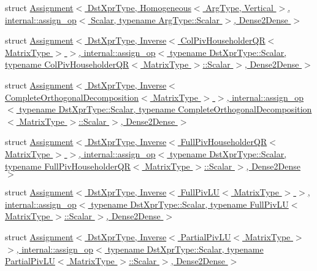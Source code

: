 \begin{DoxyCompactItemize}
\item 
struct \hyperlink{struct_eigen_1_1internal_1_1_assignment_3_01_dst_xpr_type_00_01_homogeneous_3_01_arg_type_00_01_0510af0d603205dcee3ee308c9bc1bc6}{Assignment$<$ Dst\+Xpr\+Type, Homogeneous$<$ Arg\+Type, Vertical $>$, internal\+::assign\+\_\+op$<$ Scalar, typename Arg\+Type\+::\+Scalar $>$, Dense2\+Dense $>$}
\item 
struct \hyperlink{struct_eigen_1_1internal_1_1_assignment_3_01_dst_xpr_type_00_01_inverse_3_01_col_piv_householdera738c212c6cb5ba27ad8c50c6864d6b5}{Assignment$<$ Dst\+Xpr\+Type, Inverse$<$ Col\+Piv\+Householder\+Q\+R$<$ Matrix\+Type $>$ $>$, internal\+::assign\+\_\+op$<$ typename Dst\+Xpr\+Type\+::\+Scalar, typename Col\+Piv\+Householder\+Q\+R$<$ Matrix\+Type $>$\+::\+Scalar $>$, Dense2\+Dense $>$}
\item 
struct \hyperlink{struct_eigen_1_1internal_1_1_assignment_3_01_dst_xpr_type_00_01_inverse_3_01_complete_orthogonalcd5d352c5ea4dcae855a0a56ba39cbfd}{Assignment$<$ Dst\+Xpr\+Type, Inverse$<$ Complete\+Orthogonal\+Decomposition$<$ Matrix\+Type $>$ $>$, internal\+::assign\+\_\+op$<$ typename Dst\+Xpr\+Type\+::\+Scalar, typename Complete\+Orthogonal\+Decomposition$<$ Matrix\+Type $>$\+::\+Scalar $>$, Dense2\+Dense $>$}
\item 
struct \hyperlink{struct_eigen_1_1internal_1_1_assignment_3_01_dst_xpr_type_00_01_inverse_3_01_full_piv_householde4c13323440da58b97e1a51d313048bfd}{Assignment$<$ Dst\+Xpr\+Type, Inverse$<$ Full\+Piv\+Householder\+Q\+R$<$ Matrix\+Type $>$ $>$, internal\+::assign\+\_\+op$<$ typename Dst\+Xpr\+Type\+::\+Scalar, typename Full\+Piv\+Householder\+Q\+R$<$ Matrix\+Type $>$\+::\+Scalar $>$, Dense2\+Dense $>$}
\item 
struct \hyperlink{struct_eigen_1_1internal_1_1_assignment_3_01_dst_xpr_type_00_01_inverse_3_01_full_piv_l_u_3_01_m9a195c884433725cd2990fc22dc66c56}{Assignment$<$ Dst\+Xpr\+Type, Inverse$<$ Full\+Piv\+L\+U$<$ Matrix\+Type $>$ $>$, internal\+::assign\+\_\+op$<$ typename Dst\+Xpr\+Type\+::\+Scalar, typename Full\+Piv\+L\+U$<$ Matrix\+Type $>$\+::\+Scalar $>$, Dense2\+Dense $>$}
\item 
struct \hyperlink{struct_eigen_1_1internal_1_1_assignment_3_01_dst_xpr_type_00_01_inverse_3_01_partial_piv_l_u_3_0fe0876a690a87045a6eaca571908231d}{Assignment$<$ Dst\+Xpr\+Type, Inverse$<$ Partial\+Piv\+L\+U$<$ Matrix\+Type $>$ $>$, internal\+::assign\+\_\+op$<$ typename Dst\+Xpr\+Type\+::\+Scalar, typename Partial\+Piv\+L\+U$<$ Matrix\+Type $>$\+::\+Scalar $>$, Dense2\+Dense $>$}
\item 

\end{DoxyCompactItemize}
